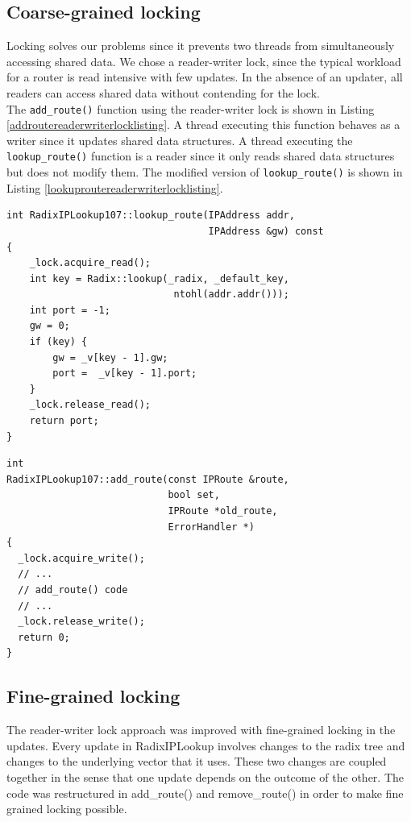 \documentclass[a4paper,marginparwidth=50pt,marginparsep=10pt]{article}
\begin{document}
\subsection{Coarse-grained locking}
Locking solves our problems since it prevents two threads from simultaneously accessing shared data. We chose a reader-writer lock, since the typical workload for a router is read intensive with few updates. In the absence of an updater, all readers can access shared data without contending for the lock.\\

The \verb+add_route()+ function using the reader-writer lock is shown in Listing \ref{addroutereaderwriterlocklisting}. A thread executing this function behaves as a writer since it updates shared data structures. A thread executing the \verb+lookup_route()+ function is a reader since it only reads shared data structures but does not modify them. The modified version of \verb+lookup_route()+ is shown in Listing \ref{lookuproutereaderwriterlocklisting}.
\begin{lstlisting}[caption = Reader-writer lock usage in lookup\_route(), label=lookuproutereaderwriterlocklisting,float=tph]
int RadixIPLookup107::lookup_route(IPAddress addr, 
                                   IPAddress &gw) const
{  
    _lock.acquire_read();
    int key = Radix::lookup(_radix, _default_key,
                             ntohl(addr.addr()));
    int port = -1;
    gw = 0;    
    if (key) {
        gw = _v[key - 1].gw;
        port =  _v[key - 1].port;
    }
    _lock.release_read();
    return port;
}
\end{lstlisting}

\begin{lstlisting}[caption = Reader-writer lock usage in add\_route(), label=addroutereaderwriterlocklisting,float=tph]
int
RadixIPLookup107::add_route(const IPRoute &route, 
                            bool set, 
                            IPRoute *old_route, 
                            ErrorHandler *)
{
  _lock.acquire_write();
  // ...
  // add_route() code
  // ...
  _lock.release_write();
  return 0;
}
\end{lstlisting}

\subsection{Fine-grained locking}
The reader-writer lock approach was improved with fine-grained locking in the updates. Every update in RadixIPLookup involves changes to the radix tree and changes to the underlying vector that it uses. These two changes are coupled together in the sense that one update depends on the outcome of the other. The code was restructured in add\_route() and remove\_route() in order to make fine grained locking possible.
\end{document}
